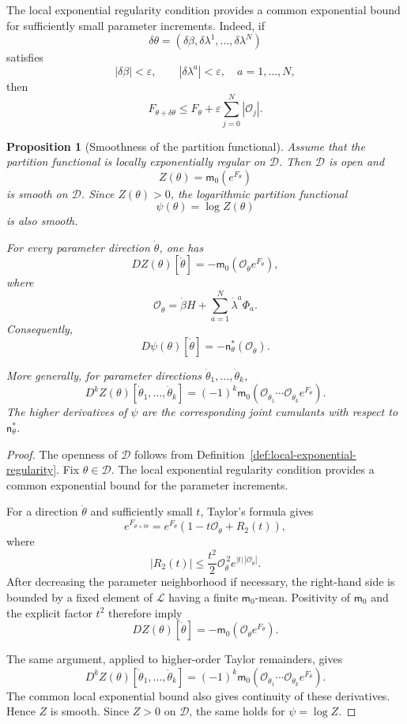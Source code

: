 \documentclass[10pt,a4paper]{amsart}
\newtheorem{Proposition}[Theorem]{Proposition}
\begin{document}
The local exponential regularity condition provides a common
exponential bound for sufficiently small parameter increments. Indeed,
if
\[
\delta\theta
=
(\delta\beta,\delta\lambda^1,\ldots,\delta\lambda^N)
\]
satisfies
\[
|\delta\beta|<\varepsilon,
\qquad
|\delta\lambda^a|<\varepsilon,
\quad
a=1,\ldots,N,
\]
then
\[
F_{\theta+\delta\theta}
\leq
F_\theta
+
\varepsilon\sum_{j=0}^{N}|\mathcal O_j|.
\]

\begin{Proposition}[Smoothness of the partition functional]
\label{prop:partition-smoothness}
Assume that the partition functional is locally exponentially regular
on $\mathcal D$. Then $\mathcal D$ is open and
\[
Z(\theta)=\mathsf m_0(e^{F_\theta})
\]
is smooth on $\mathcal D$. Since $Z(\theta)>0$, the logarithmic
partition functional
\[
\psi(\theta)=\log Z(\theta)
\]
is also smooth.

For every parameter direction $\dot\theta$, one has
\[
DZ(\theta)[\dot\theta]
=
-\mathsf m_0\left(
\mathcal O_{\dot\theta}e^{F_\theta}
\right),
\]
where
\[
\mathcal O_{\dot\theta}
=
\dot\beta H+\sum_{a=1}^{N}\dot\lambda^a\Phi_a.
\]
Consequently,
\[
D\psi(\theta)[\dot\theta]
=
-\mathsf n_\theta^*(\mathcal O_{\dot\theta}).
\]

More generally, for parameter directions
$\dot\theta_1,\ldots,\dot\theta_k$,
\[
D^kZ(\theta)
[\dot\theta_1,\ldots,\dot\theta_k]
=
(-1)^k
\mathsf m_0\left(
\mathcal O_{\dot\theta_1}\cdots
\mathcal O_{\dot\theta_k}
e^{F_\theta}
\right).
\]
The higher derivatives of $\psi$ are the corresponding joint cumulants
with respect to $\mathsf n_\theta^*$.
\end{Proposition}

\begin{proof}
The openness of $\mathcal D$ follows from
Definition~\ref{def:local-exponential-regularity}. Fix
$\theta\in\mathcal D$. The local exponential regularity condition
provides a common exponential bound for the parameter increments.

For a direction $\dot\theta$ and sufficiently small $t$, Taylor's
formula gives
\[
e^{F_{\theta+t\dot\theta}}
=
e^{F_\theta}
\left(
1-t\mathcal O_{\dot\theta}
+
R_2(t)
\right),
\]
where
\[
|R_2(t)|
\leq
\frac{t^2}{2}
\mathcal O_{\dot\theta}^{\,2}
e^{|t|\,|\mathcal O_{\dot\theta}|}.
\]
After decreasing the parameter neighborhood if necessary, the
right-hand side is bounded by a fixed element of $\mathcal L$ having a
finite $\mathsf m_0$-mean. Positivity of $\mathsf m_0$ and the explicit
factor $t^2$ therefore imply
\[
DZ(\theta)[\dot\theta]
=
-\mathsf m_0\left(
\mathcal O_{\dot\theta}e^{F_\theta}
\right).
\]

The same argument, applied to higher-order Taylor remainders, gives
\[
D^kZ(\theta)
[\dot\theta_1,\ldots,\dot\theta_k]
=
(-1)^k
\mathsf m_0\left(
\mathcal O_{\dot\theta_1}\cdots
\mathcal O_{\dot\theta_k}
e^{F_\theta}
\right).
\]
The common local exponential bound also gives continuity of these
derivatives. Hence $Z$ is smooth. Since $Z>0$ on $\mathcal D$, the same
holds for $\psi=\log Z$.
\end{proof}
\end{document}
